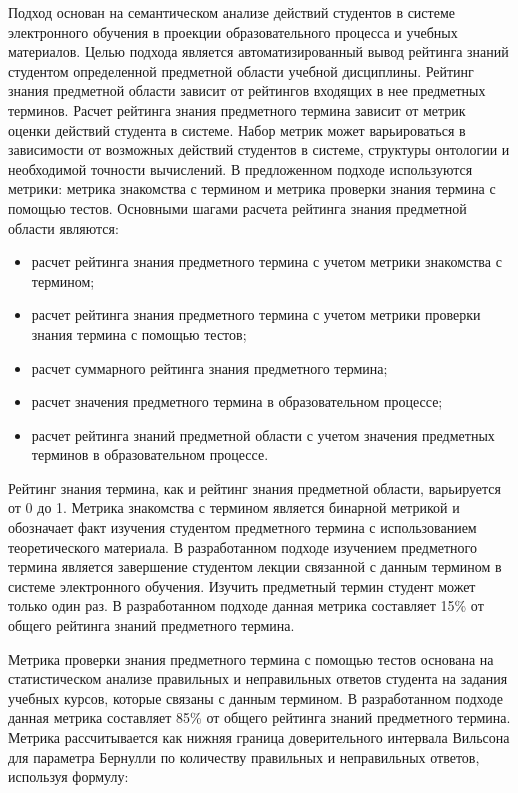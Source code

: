 Подход основан на семантическом анализе действий студентов в системе электронного обучения в проекции образовательного процесса и учебных материалов. Целью подхода является автоматизированный вывод рейтинга знаний студентом определенной предметной области учебной дисциплины. Рейтинг знания предметной области зависит от рейтингов входящих в нее предметных терминов. Расчет рейтинга знания предметного термина зависит от метрик оценки действий студента в системе. Набор метрик может варьироваться в зависимости от возможных действий студентов в системе, структуры онтологии и необходимой точности вычислений. В предложенном подходе используются метрики: метрика знакомства с термином и метрика проверки знания термина с помощью тестов. Основными шагами расчета рейтинга знания предметной области являются:


\begin{itemize}
\item расчет рейтинга знания предметного термина с учетом метрики знакомства с термином;
\item расчет рейтинга знания предметного термина с учетом метрики проверки знания термина с помощью тестов;
\item расчет суммарного рейтинга знания предметного термина;
\item расчет значения предметного термина в образовательном процессе;
\item расчет рейтинга знаний предметной области с учетом значения предметных терминов в образовательном процессе.
\end{itemize}

Рейтинг знания термина, как и рейтинг знания предметной области, варьируется от 0 до 1. Метрика знакомства с термином является бинарной метрикой и обозначает факт изучения студентом предметного термина с использованием теоретического материала. В разработанном подходе изучением предметного термина является завершение студентом лекции связанной с данным термином в системе электронного обучения. Изучить предметный термин студент может только один раз. В разработанном подходе данная метрика составляет 15\% от общего рейтинга знаний предметного термина.

Метрика проверки знания предметного термина с помощью тестов основана на статистическом анализе правильных и неправильных ответов студента на задания учебных курсов, которые связаны с данным термином. В разработанном подходе данная метрика составляет 85\% от общего рейтинга знаний предметного термина. Метрика рассчитывается как нижняя граница доверительного интервала Вильсона для параметра Бернулли по количеству правильных и неправильных ответов, используя формулу:

